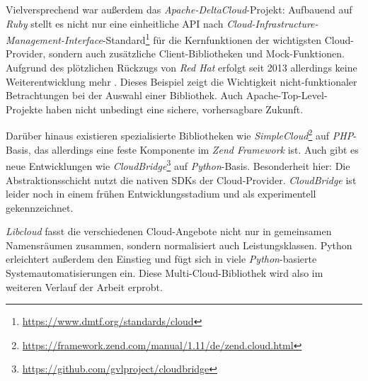 \noindent Vielversprechend war außerdem das \emph{Apache-DeltaCloud}-Projekt: Aufbauend auf \emph{Ruby} stellt es nicht nur eine einheitliche API nach \emph{Cloud-Infrastructure-Management-Interface}-Standard\footnote{\url{https://www.dmtf.org/standards/cloud}} für die Kernfunktionen der wichtigsten Cloud-Provider, sondern auch zusätzliche Client-Bibliotheken und Mock-Funktionen. Aufgrund des plötzlichen Rückzugs von \emph{Red Hat} erfolgt seit 2013 allerdings keine Weiterentwicklung mehr \cite{androu:2013:deltacloud-red-hat-end}. Dieses Beispiel zeigt die Wichtigkeit nicht-funktionaler Betrachtungen bei der Auswahl einer Bibliothek. Auch Apache-Top-Level-Projekte haben nicht unbedingt eine sichere, vorhersagbare Zukunft.

Darüber hinaus existieren spezialisierte Bibliotheken wie \emph{SimpleCloud}\footnote{\url{https://framework.zend.com/manual/1.11/de/zend.cloud.html}} auf \emph{PHP}-Basis, das allerdings eine feste Komponente im \emph{Zend Framework} ist. Auch gibt es neue Entwicklungen wie \emph{CloudBridge}\footnote{\url{https://github.com/gvlproject/cloudbridge}} auf \emph{Python}-Basis. Besonderheit hier: Die Abstraktionsschicht nutzt die nativen SDKs der Cloud-Provider. \emph{CloudBridge} ist leider noch in einem frühen Entwicklungsstadium und als experimentell gekennzeichnet.

\emph{Libcloud} fasst die verschiedenen Cloud-Angebote nicht nur in gemeinsamen Namensräumen zusammen, sondern normalisiert auch Leistungsklassen. Python erleichtert außerdem den Einstieg und fügt sich in viele \emph{Python}-basierte Systemautomatisierungen ein. Diese Multi-Cloud-Bibliothek wird also im weiteren Verlauf der Arbeit erprobt.

